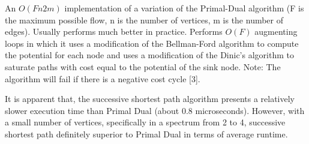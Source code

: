 	\qquad An $O(Fn2m)$ implementation of a variation of the Primal-Dual algorithm (F is the maximum possible flow, n is the number of vertices, m is the number of edges). Usually performs much better in practice. Performs $O(F)$ augmenting loops in which it uses a modification of the Bellman-Ford algorithm to compute the potential for each node and uses a modification of the Dinic’s algorithm to saturate paths with cost equal to the potential of the sink node. Note: The algorithm will fail if there is a negative cost cycle [3].

	\qquad It is apparent that, the successive shortest path algorithm presents a relatively slower execution time than Primal Dual (about 0.8 microseconds). However, with a small number of vertices, specifically in a spectrum from 2 to 4, successive shortest path definitely superior to Primal Dual in terms of average runtime.
	